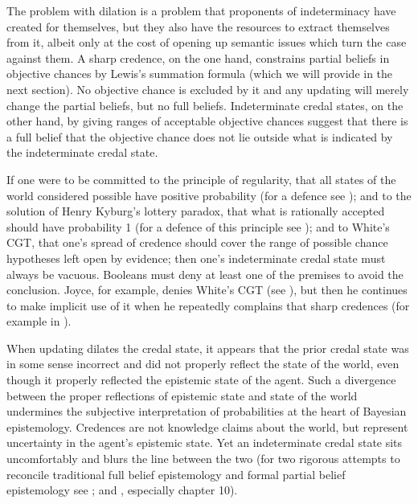 \documentclass[11pt]{article}
\begin{document}
The problem with dilation is a problem that proponents of
indeterminacy have created for themselves, but they also have the
resources to extract themselves from it, albeit only at the cost of
opening up semantic issues which turn the case against them. A sharp
credence, on the one hand, constrains partial beliefs in objective
chances by Lewis's summation formula (which we will provide in the
next section). No objective chance is excluded by it and any updating
will merely change the partial beliefs, but no full beliefs.
Indeterminate credal states, on the other hand, by giving ranges of
acceptable objective chances suggest that there is a full belief that
the objective chance does not lie outside what is indicated by the
indeterminate credal state. 

If one were to be committed to the principle of regularity, that all
states of the world considered possible have positive probability (for
a defence see ); and to the solution of
Henry Kyburg's lottery paradox, that what is rationally accepted
should have probability 1 (for a defence of this principle see
); and to White's CGT, that one's
spread of credence should cover the range of possible chance
hypotheses left open by evidence; then one's indeterminate credal
state must always be vacuous. Booleans must deny at least one of the
premises to avoid the conclusion. Joyce, for example, denies White's
CGT (see ), but then he continues to make
implicit use of it when he repeatedly complains that sharp credences
 (for example in ). 

When updating dilates the credal state, it appears that the prior
credal state was in some sense incorrect and did not properly reflect
the state of the world, even though it properly reflected the
epistemic state of the agent. Such a divergence between the proper
reflections of epistemic state and state of the world undermines the
subjective interpretation of probabilities at the heart of Bayesian
epistemology. Credences are not knowledge claims about the world, but
represent uncertainty in the agent's epistemic state. Yet an
indeterminate credal state sits uncomfortably and blurs the line
between the two (for two rigorous attempts to reconcile traditional
full belief epistemology and formal partial belief epistemology see
; and , especially chapter 10).
\end{document}
